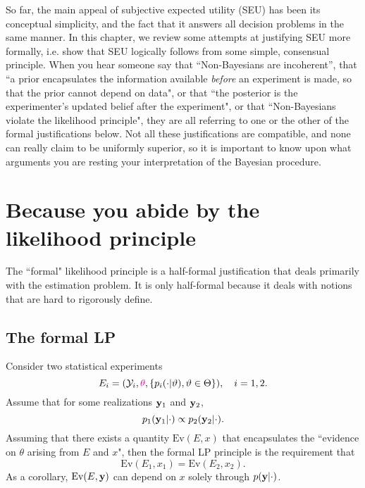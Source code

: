 So far, the main appeal of subjective expected utility (SEU) has been its conceptual simplicity, and the fact that it answers all decision problems in the same manner. 
In this chapter, we review some attempts at justifying SEU more formally, i.e. show that SEU logically follows from some simple, consensual principle.
When you hear someone say that ``Non-Bayesians are incoherent'', that ``a prior encapsulates the information available \emph{before} an experiment is made, so that the prior cannot depend on data", or that ``the posterior is the experimenter's updated belief after the experiment", or that ``Non-Bayesians violate the likelihood principle", they are all referring to one or the other of the formal justifications below. 
Not all these justifications are compatible, and none can really claim to be uniformly superior, so it is important to know upon what arguments you are resting your interpretation of the Bayesian procedure.

\section{Because you abide by the likelihood principle}
The ``formal" likelihood principle \citep{BeWo88} is a half-formal justification that deals primarily with the estimation problem. 
It is only half-formal because it deals with notions that are hard to rigorously define.

\subsection{The formal LP}
Consider two statistical experiments
$$
E_i=(\mathcal{Y}_i,\textcolor{magenta}{\theta}, \{p_i(\cdot\vert\vartheta), \vartheta\in\Theta\}), \quad i=1,2.
$$
Assume that for some realizations $\mathbf{y}_1$ and $\mathbf{y}_2$,
$$
p_1(\mathbf{y}_1\vert\cdot) \propto p_2(\mathbf{y}_2\vert \cdot).
$$
Assuming that there exists a quantity $\text{Ev}(E,x)$ that encapsulates the ``evidence on $\theta$ arising from $E$ and $x$", then the formal LP principle is the requirement that
$$
\text{Ev}(E_1,x_1) = \text{Ev}(E_2,x_2).
$$
As a corollary, $\text{Ev}(E,\mathbf{y})$ can depend on $x$ solely through $p(\mathbf{y}\vert\cdot)$.

